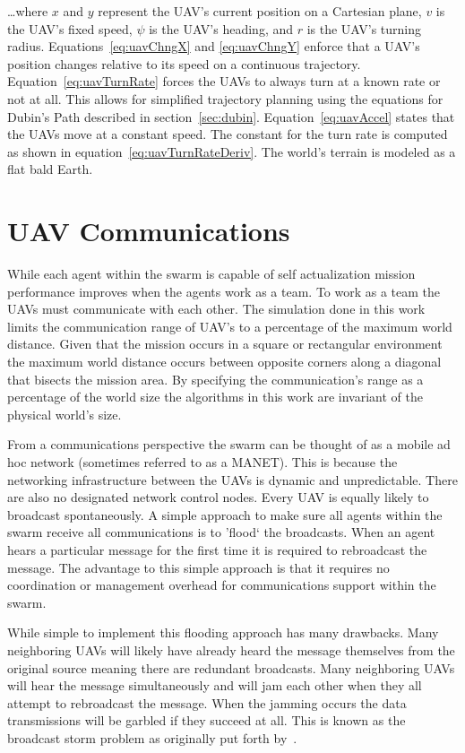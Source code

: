 \dots where $x$ and $y$ represent the UAV's current position on a Cartesian plane, $v$ is the UAV's fixed speed, $\psi$ is the UAV's heading, and $r$ is the UAV's turning radius.  Equations~\ref{eq:uavChngX} and \ref{eq:uavChngY} enforce that a UAV's position changes relative to its speed on a continuous trajectory.  Equation~\ref{eq:uavTurnRate} forces the UAVs to always turn at a known rate or not at all.  This allows for simplified trajectory planning using the equations for Dubin's Path described in section~\ref{sec:dubin}.  Equation~\ref{eq:uavAccel} states that the UAVs move at a constant speed.  The constant for the turn rate is computed as shown in equation~\ref{eq:uavTurnRateDeriv}.  The world's terrain is modeled as a flat bald Earth.


\section{UAV Communications}
While each agent within the swarm is capable of self actualization mission performance improves when the agents work as a team.  To work as a team the UAVs must communicate with each other.  The simulation done in this work limits the communication range of UAV's to a percentage of the maximum world distance.  Given that the mission occurs in a square or rectangular environment the maximum world distance occurs between opposite corners along a diagonal that bisects the mission area.  By specifying the communication's range as a percentage of the world size the algorithms in this work are invariant of the physical world's size.

From a communications perspective the swarm can be thought of as a mobile ad hoc network (sometimes referred to as a MANET).  This is because the networking infrastructure between the UAVs is dynamic and unpredictable.  There are also no designated network control nodes.  Every UAV is equally likely to broadcast spontaneously.  A simple approach to make sure all agents within the swarm receive all communications is to 'flood` the broadcasts.  When an agent hears a particular message for the first time it is required to rebroadcast the message.  The advantage to this simple approach is that it requires no coordination or management overhead for communications support within the swarm.

While simple to implement this flooding approach has many drawbacks.  Many neighboring UAVs will likely have already heard the message themselves from the original source meaning there are redundant broadcasts.  Many neighboring UAVs will hear the message simultaneously and will jam each other when they all attempt to rebroadcast the message.  When the jamming occurs the data transmissions will be garbled if they succeed at all.  This is known as the broadcast storm problem as originally put forth by~\cite{bstorm}.

